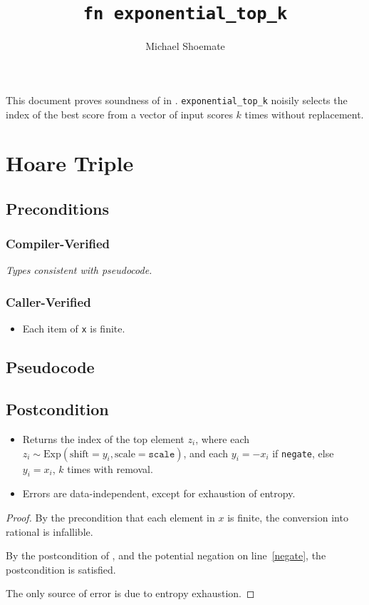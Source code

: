 \documentclass{article}
\title{\texttt{fn exponential\_top\_k}}
\author{Michael Shoemate}
\begin{document}
\maketitle\contrib
This document proves soundness of  in . 
\texttt{exponential\_top\_k} noisily selects the index of the best score from a vector of input scores $k$ times without replacement.

\section{Hoare Triple}
\subsection*{Preconditions}
\subsubsection*{Compiler-Verified}
\textit{Types consistent with pseudocode.}

\subsubsection*{Caller-Verified}
\begin{itemize}
    \item Each item of \texttt{x} is finite.
\end{itemize}

\subsection*{Pseudocode}
\label{sec:python-pseudocode}


\subsection*{Postcondition}
\begin{theorem}
    \label{postcondition}
    \begin{itemize}
        \item Returns the index of the top element $z_i$,
        where each $z_i \sim \mathrm{Exp}(\mathrm{shift}=y_i, \mathrm{scale}=\texttt{scale})$,
        and each $y_i = -x_i$ if \texttt{negate}, else $y_i = x_i$,
        $k$ times with removal.
        \item Errors are data-independent, except for exhaustion of entropy.
    \end{itemize}
\end{theorem}

\begin{proof}
    By the precondition that each element in $x$ is finite,
    the conversion into rational is infallible.
    
    By the postcondition of ,
    and the potential negation on line~\ref{negate},
    the postcondition is satisfied.

    The only source of error is due to entropy exhaustion.
\end{proof}
\end{document}
